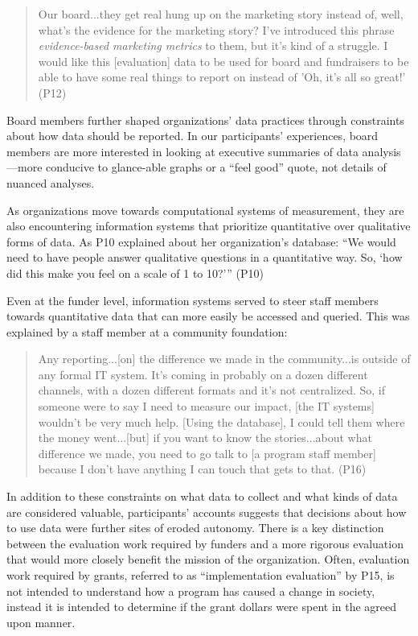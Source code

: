 \begin{quote}\singlespacing Our board...they get real hung up on the marketing story instead of, well, what's the evidence for the marketing story? I've introduced this phrase \textit{evidence-based marketing metrics} to them, but it's kind of a struggle. I would like this [evaluation] data to be used for board and fundraisers to be able to have some real things to report on instead of 'Oh, it's all so great!' (P12)\end{quote}

Board members further shaped organizations’ data practices through constraints about how data should be reported. In our participants’ experiences, board members are more interested in looking at executive summaries of data analysis---more conducive to glance-able graphs or a “feel good” quote, not details of nuanced analyses.

As organizations move towards computational systems of measurement, they are also encountering information systems that prioritize quantitative over qualitative forms of data. As P10 explained about her organization’s database: “We would need to have people answer qualitative questions in a quantitative way. So, ‘how did this make you feel on a scale of 1 to 10?’” (P10) 

Even at the funder level, information systems served to steer staff members towards quantitative data that can more easily be accessed and queried. This was explained by a staff member at a community foundation:

\begin{quote}\singlespacing Any reporting...[on] the difference we made in the community...is outside of any formal IT system. It’s coming in probably on a dozen different channels, with a dozen different formats and it’s not centralized. So, if someone were to say I need to measure our impact, [the IT systems] wouldn’t be very much help. [Using the database], I could tell them where the money went...[but] if you want to know the stories...about what difference we made, you need to go talk to [a program staff member] because I don’t have anything I can touch that gets to that. (P16)\end{quote}

In addition to these constraints on what data to collect and what kinds of data are considered valuable, participants’ accounts suggests that decisions about how to use data were further sites of eroded autonomy. There is a key distinction between the evaluation work required by funders and a more rigorous evaluation that would more closely benefit the mission of the organization. Often, evaluation work required by grants, referred to as “implementation evaluation” by P15, is not intended to understand how a program has caused a change in society, instead it is intended to determine if the grant dollars were spent in the agreed upon manner.

